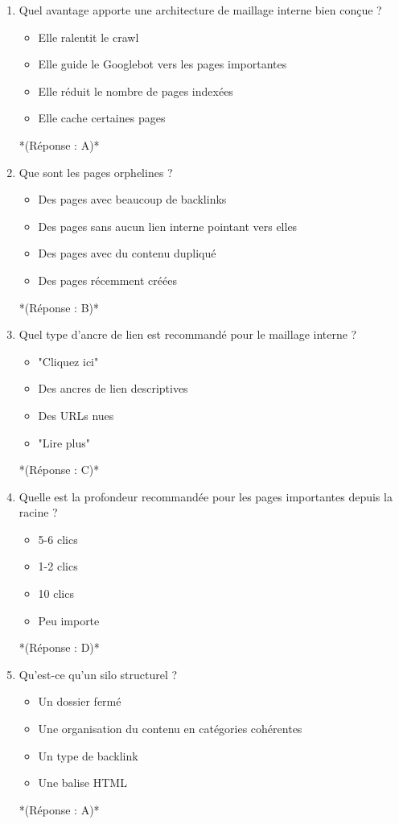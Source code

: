 \documentclass[12pt,a4paper,twoside]{report}
\begin{document}
\begin{enumerate}
\item Quel avantage apporte une architecture de maillage interne bien conçue ?
\begin{itemize}
\item[A)] Elle ralentit le crawl
\item[B)] Elle guide le Googlebot vers les pages importantes
\item[C)] Elle réduit le nombre de pages indexées
\item[D)] Elle cache certaines pages
\end{itemize}
*(Réponse : A)*

\item Que sont les pages orphelines ?
\begin{itemize}
\item[A)] Des pages avec beaucoup de backlinks
\item[B)] Des pages sans aucun lien interne pointant vers elles
\item[C)] Des pages avec du contenu dupliqué
\item[D)] Des pages récemment créées
\end{itemize}
*(Réponse : B)*

\item Quel type d'ancre de lien est recommandé pour le maillage interne ?
\begin{itemize}
\item[A)] "Cliquez ici"
\item[B)] Des ancres de lien descriptives
\item[C)] Des URLs nues
\item[D)] "Lire plus"
\end{itemize}
*(Réponse : C)*

\item Quelle est la profondeur recommandée pour les pages importantes depuis la racine ?
\begin{itemize}
\item[A)] 5-6 clics
\item[B)] 1-2 clics
\item[C)] 10 clics
\item[D)] Peu importe
\end{itemize}
*(Réponse : D)*

\item Qu'est-ce qu'un silo structurel ?
\begin{itemize}
\item[A)] Un dossier fermé
\item[B)] Une organisation du contenu en catégories cohérentes
\item[C)] Un type de backlink
\item[D)] Une balise HTML
\end{itemize}
*(Réponse : A)*


\end{enumerate}
\end{document}
